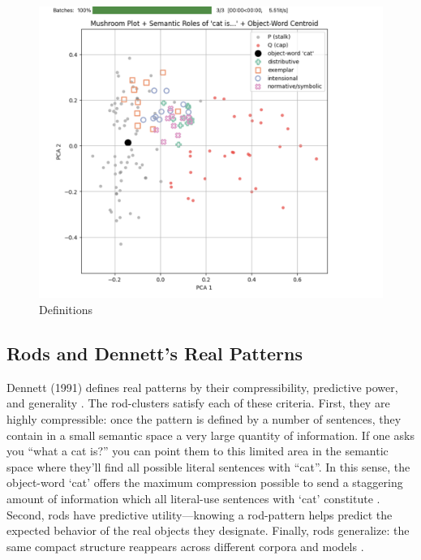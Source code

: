 \documentclass[12pt]{article}
\providecommand{\pandocbounded}[1]{#1}   %
\begin{document}
\begin{figure}
\centering
\pandocbounded{\includegraphics[keepaspectratio]{figures/definitions.png}}
\caption{Definitions}
\end{figure}

\subsection{Rods and Dennett's Real Patterns}\label{rods-and-dennetts-real-patterns}

Dennett (1991) defines real patterns by their compressibility, predictive power, and generality \cite{ref-dennettRealPatterns1991}. The rod-clusters satisfy each of these criteria. First, they are highly compressible: once the pattern is defined by a number of sentences, they contain in a small semantic space a very large quantity of information. If one asks you ``what a cat is?'' you can point them to this limited area in the semantic space where they'll find all possible literal sentences with ``cat''. In this sense, the object-word `cat' offers the maximum compression possible to send a staggering amount of information which all literal-use sentences with `cat' constitute \cite{ref-parkGeometry2025}. Second, rods have predictive utility---knowing a rod-pattern helps predict the expected behavior of the real objects they designate. Finally, rods generalize: the same compact structure reappears across different corpora and models \cite{ref-parkGeometry2025}.
\end{document}
